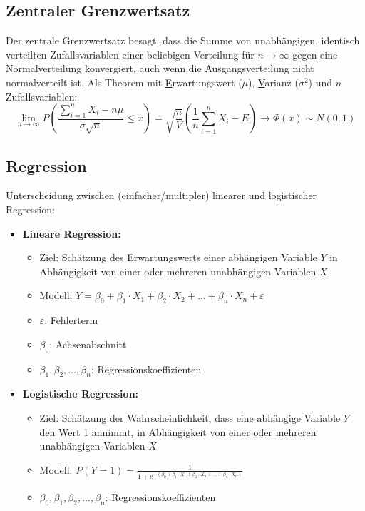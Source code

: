 \subsection{Zentraler Grenzwertsatz}

Der zentrale Grenzwertsatz besagt, dass die Summe von unabhängigen, identisch verteilten Zufallsvariablen einer beliebigen Verteilung für \(n\rightarrow\infty\) gegen eine Normalverteilung konvergiert, auch wenn die Ausgangsverteilung nicht normalverteilt ist. Als Theorem mit \underline{E}rwartungswert (\(\mu\)), \underline{V}arianz (\(\sigma^2\)) und \(n\) Zufallsvariablen:\\


\begin{equation*}
    \lim_{n\rightarrow\infty} P\left(\frac{\sum_{i=1}^{n}X_i - n\mu}{\sigma\sqrt{n}}\leq x\right) = \sqrt{\frac{n}{V}}\left(\frac{1}{n}\sum_{i=1}^{n}X_i-E\right) \rightarrow \Phi(x) \sim N(0,1)   
\end{equation*}

\subsection{Regression}

Unterscheidung zwischen (einfacher/multipler) linearer und logistischer Regression:

\begin{itemize}
    \item \textbf{Lineare Regression:}
    \begin{itemize}
        \item Ziel: Schätzung des Erwartungswerts einer abhängigen Variable \(Y\) in Abhängigkeit von einer oder mehreren unabhängigen Variablen \(X\)
        \item Modell: \(Y = \beta_0 + \beta_1 \cdot X_1 + \beta_2 \cdot X_2 + \ldots + \beta_n \cdot X_n + \varepsilon\)
        \item \(\varepsilon\): Fehlerterm
        \item \(\beta_0\): Achsenabschnitt
        \item \(\beta_1, \beta_2, \ldots, \beta_n\): Regressionskoeffizienten
    \end{itemize}
    \item \textbf{Logistische Regression:}
    \begin{itemize}
        \item Ziel: Schätzung der Wahrscheinlichkeit, dass eine abhängige Variable \(Y\) den Wert 1 annimmt, in Abhängigkeit von einer oder mehreren unabhängigen Variablen \(X\)
        \item Modell: \(P(Y=1) = \frac{1}{1+e^{-(\beta_0 + \beta_1 \cdot X_1 + \beta_2 \cdot X_2 + \ldots + \beta_n \cdot X_n)}}\)
        \item \(\beta_0, \beta_1, \beta_2, \ldots, \beta_n\): Regressionskoeffizienten
    \end{itemize}
\end{itemize}